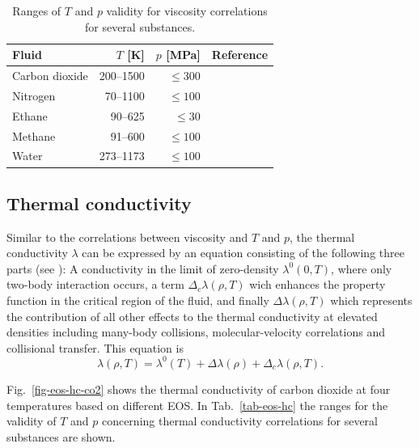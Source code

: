 \begin{table}[H]
  \caption{\label{tab-eos-visc}Ranges of $T$ and $p$ validity for viscosity correlations for several substances.}
  \begin{center}
  \begin{tabular}{lrrl}
  \toprule
  Fluid 		& $T$ [K]		& $p$ [MPa] 	& Reference \\
  \midrule
  Carbon dioxide 	& 200--1500		& $\leq{300}$ 	& \cite{FenWakVes:98}\\
  Nitrogen       	& 70--1100		& $\leq{100}$ 	& \cite{SteKraLae:87}\\  
  Ethane         	& 90--625		& $\leq{30}$ 	& \cite{FriIngEly:91}\\ 
  Methane       	&	91--600		& $\leq{100}$	& \cite{FriElyIng:89}\\  
  Water          	& 273--1173		& $\leq{100}$	& \cite{IAPWS:08a}\\
  \bottomrule
 \end{tabular}
 \end{center}
\end{table}
  

\subsection {Thermal conductivity} \label{sec-thermal-conductivity}
Similar to the correlations between viscosity and $T$ and $p$, the thermal conductivity $\lambda$ can be expressed by an equation consisting of the following three parts (see \cite{VesWak:90}): A conductivity in the limit of zero-density $\lambda^0(0,T)$, where only two-body interaction occurs, a term $\Delta_c\lambda (\rho,T)$ wich enhances the property function in the critical region of the fluid, and finally $\Delta\lambda (\rho,T)$ which represents the contribution of all other effects to the thermal conductivity at elevated densities including many-body collisions, molecular-velocity correlations and collisional transfer. This equation is
%
\begin{equation}
\lambda (\rho,T) = \lambda^0 (T) + \Delta\lambda (\rho)+ \Delta_c \lambda (\rho,T).
\label{EqEOS_visc}
\end{equation}

Fig.~\ref{fig-eos-hc-co2} shows the thermal conductivity of carbon dioxide at four temperatures based on different EOS. In Tab.~\ref{tab-eos-hc} the ranges for the validity of $T$ and $p$ concerning thermal conductivity correlations for several substances are shown.


